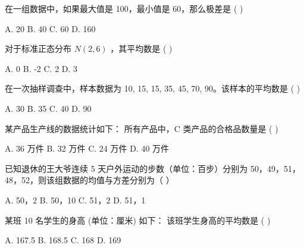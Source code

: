 \documentclass[11pt, a4paper]{article}
\begin{document}
\begin{baitap}[1]
在一组数据中，如果最大值是 100，最小值是 60，那么极差是 ( )
\par\vspace{3pt}
\noindent A. 20 \quad B. 40 \quad C. 60 \quad D. 160
\end{baitap}
\begin{baitap}[2]
对于标准正态分布 $N(2,6)$ ，其平均数是 ( )
\par\vspace{3pt}
\noindent A. 0 \quad B. -2 \quad C. 2 \quad D. 3
\end{baitap}
\begin{baitap}[3]
在一次抽样调查中，样本数据为 10, 15, 15, 35, 45, 70, 90。该样本的平均数是 ( )
\par\vspace{3pt}
\noindent A. 30 \quad B. 35 \quad C. 40 \quad D. 90
\end{baitap}
\begin{baitap}[4]
某产品生产线的数据统计如下：
所有产品中，C 类产品的合格品数量是 ( )
\par\vspace{3pt}
\noindent A. 36 万件 \quad B. 32 万件 \quad C. 24 万件 \quad D. 40 万件
\end{baitap}
\begin{baitap}[5]
已知退休的王大爷连续 5 天户外运动的步数（单位：百步）分别为 50，49，51，48，52，则该组数据的均值与方差分别为（ ）
\par\vspace{3pt}
\noindent A. 50，2 \quad B. 50，10 \quad C. 51，2 \quad D. 51，1
\end{baitap}
\begin{baitap}[6]
某班 10 名学生的身高 (单位：厘米) 如下：
该班学生身高的平均数是 ( )
\par\vspace{3pt}
\noindent A. 167.5 \quad B. 168.5 \quad C. 168 \quad D. 169
\end{baitap}
\end{document}
